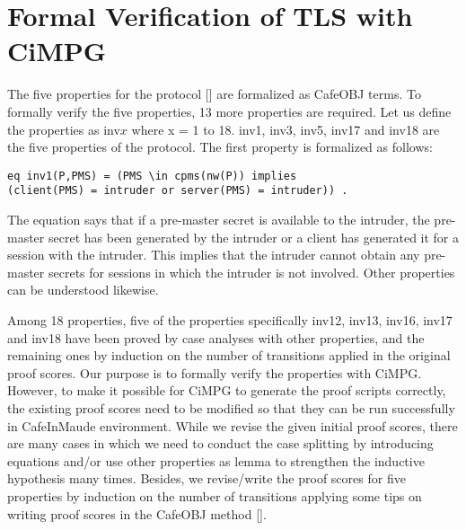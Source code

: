 \documentclass[a4paper,fleqn]{cas-dc}
\begin{document}
\section{Formal Verification of TLS with CiMPG}\label{fvtls}
The five properties for the protocol [\cite{1437139}] are formalized as CafeOBJ terms. To formally verify the five properties, 13 more properties are required. Let us define the properties as inv$x$ where x = 1 to 18. inv1, inv3, inv5, inv17 and inv18 are the five properties of the protocol. The first property is formalized as follows: 
\begin{small}
\begin{verbatim}
eq inv1(P,PMS) = (PMS \in cpms(nw(P)) implies 
(client(PMS) = intruder or server(PMS) = intruder)) .
\end{verbatim}
\end{small}
The equation says that if a pre-master secret is available to the intruder, the pre-master secret has been generated by the intruder or a client has generated it for a session with the intruder. This implies that the intruder cannot obtain any pre-master secrets for sessions in which the intruder is not involved. Other properties can be understood likewise.

Among 18 properties, five of the properties specifically inv12, inv13, inv16, inv17 and inv18 have been proved by case analyses with other properties, and the remaining ones by induction on the number of transitions applied in the original proof scores. Our purpose is to formally verify the properties with CiMPG. However,  to  make  it  possible  for  CiMPG  to  generate  the proof scripts correctly, the existing proof scores need to be modified so that they can be run successfully in CafeInMaude environment. While we revise the given initial proof scores, there are many cases in which we need to conduct the case splitting by introducing equations and/or use other properties as lemma to strengthen the inductive hypothesis many times. Besides, we revise/write the proof scores for five properties by induction on the number of transitions applying some tips on writing proof scores in the CafeOBJ method [\cite{Ogata2006}].
\end{document}
